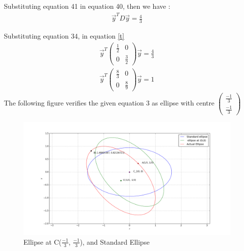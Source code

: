 \documentclass[journal,12pt,twocolumn]{IEEEtran}
\newcommand{\myvec}[1]{\ensuremath{\begin{pmatrix}#1\end{pmatrix}}}
\begin{document}
Substituting equation 41 in equation 40, then we have :
\begin{align}\label{t}
 \vec{y}^TD\vec{y}=\frac{4}{3}  
\end{align}

Substituting  equation 34, in equation \eqref{t} 
\begin{align}
    \vec{y}^T \myvec{\frac{1}{2} & 0\\0 &\frac{3}{2}}\vec{y}=\frac{4}{3}
\end{align}
\begin{align}
    \vec{y}^T \myvec{\frac{8}{3} & 0\\0 &\frac{8}{9}}\vec{y}=1
\end{align}
The following figure verifies the given equation 3 as ellipse with centre $\myvec{\frac{-1}{3}\\\frac{-1}{3}}$
\begin{figure}[!ht]
\centering
\includegraphics[width=\columnwidth]{fig.png}
\caption{Ellipse at C($\frac{-1}{3}$, $\frac{-1}{3}$), and Standard Ellipse}
\label{Fig}
\end{figure}
\end{document}

